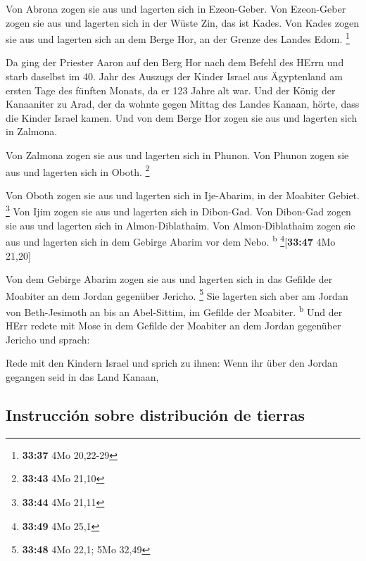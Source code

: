  Von Abrona zogen sie aus und lagerten sich in
Ezeon-Geber.  Von Ezeon-Geber zogen sie aus und lagerten
sich in der Wüste Zin, das ist Kades.  Von Kades zogen
sie aus und lagerten sich an dem Berge Hor, an der Grenze des Landes
Edom. \footnote{\textbf{33:37} 4Mo 20,22-29}

 Da ging der Priester Aaron auf den Berg Hor nach dem
Befehl des HErrn und starb daselbst im 40. Jahr des Auszugs der Kinder
Israel aus Ägyptenland am ersten Tage des fünften Monats,
 da er 123 Jahre alt war.  Und der König
der Kanaaniter zu Arad, der da wohnte gegen Mittag des Landes Kanaan,
hörte, dass die Kinder Israel kamen.  Und von dem Berge
Hor zogen sie aus und lagerten sich in Zalmona.

 Von Zalmona zogen sie aus und lagerten sich in Phunon.
 Von Phunon zogen sie aus und lagerten sich in Oboth.
\footnote{\textbf{33:43} 4Mo 21,10}

 Von Oboth zogen sie aus und lagerten sich in Ije-Abarim,
in der Moabiter Gebiet. \footnote{\textbf{33:44} 4Mo 21,11}
 Von Ijim zogen sie aus und lagerten sich in Dibon-Gad.
 Von Dibon-Gad zogen sie aus und lagerten sich in
Almon-Diblathaim.  Von Almon-Diblathaim zogen sie aus und
lagerten sich in dem Gebirge Abarim vor dem Nebo. \textsuperscript{b}
\footnote{\textbf{33:49} 4Mo 25,1}{[}\textbf{33:47} 4Mo 21,20{]}

 Von dem Gebirge Abarim zogen sie aus und lagerten sich
in das Gefilde der Moabiter an dem Jordan gegenüber Jericho. \footnote{\textbf{33:48}
  4Mo 22,1; 5Mo 32,49}  Sie lagerten sich aber am Jordan
von Beth-Jesimoth an bis an Abel-Sittim, im Gefilde der Moabiter.
\textsuperscript{b}  Und der HErr redete mit Mose in dem
Gefilde der Moabiter an dem Jordan gegenüber Jericho und sprach:

 Rede mit den Kindern Israel und sprich zu ihnen: Wenn
ihr über den Jordan gegangen seid in das Land Kanaan,

\hypertarget{instrucciuxf3n-sobre-distribuciuxf3n-de-tierras}{%
\subsection{Instrucción sobre distribución de
tierras}\label{instrucciuxf3n-sobre-distribuciuxf3n-de-tierras}}

